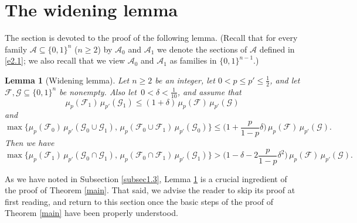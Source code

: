 \documentclass[10pt,a4paper]{amsart}
\newtheorem{lem}[thm]{Lemma}
\theoremstyle{remark}
\newcommand{\meg}{\geqslant}
\newcommand{\mik}{\leqslant}
\newcommand{\Fcal}{\mathcal{F}}
\newcommand{\Gcal}{\mathcal{G}}
\newcommand{\Acal}{\mathcal{A}}
\begin{document}

\section{The widening lemma} \label{sec4}


The section is devoted to the proof of the following lemma. (Recall that for every family
$\mathcal{A}\subseteq \{0,1\}^n$ ($n\meg 2$) by $\Acal_0$ and $\Acal_1$ we denote the
sections of $\Acal$ defined in \eqref{e2.1}; we also recall that we view
$\mathcal{A}_0$ and $\mathcal{A}_1$ as families in $\{0,1\}^{n-1}$.)
\begin{lem}[Widening lemma] \label{l4.1}
Let $n\meg 2$ be an integer, let $0<p\mik p'\mik \frac12$, and let $\Fcal,\Gcal\subseteq \{0,1\}^n$
be nonempty. Also let\, $0<\delta<\frac{1}{10}$, and assume that
\begin{equation} \label{e4.1}
\mu_p(\Fcal_1)\,\mu_{p'}(\Gcal_1)  \mik (1+\delta)\, \mu_p(\Fcal)\,\mu_{p'}(\Gcal)
\end{equation}
and
\begin{equation} \label{e4.2}  \max\big\{ \mu_p(\Fcal_0)\, \mu_{p'}(\Gcal_0  \cup\Gcal_1), \,
\mu_p(\Fcal_0\cup\Fcal_1)\, \mu_{p'}(\Gcal_0) \big\}  \mik \Big(1+\frac{p}{1-p}\delta\Big)\,
\mu_p(\Fcal)\, \mu_{p'}(\Gcal).
\end{equation}
Then we have
\begin{equation} \label{e4.3}
\max\big\{ \mu_p(\Fcal_1)\,\mu_{p'}(\Gcal_0\cap\Gcal_1), \,
\mu_p(\Fcal_0\cap\Fcal_1)\,\mu_{p'}(\Gcal_1)\big\} >
\Big(1-\delta-2\frac{p}{1-p}\delta^2\Big)\, \mu_p(\Fcal)\, \mu_{p'}(\Gcal).
\end{equation}
\end{lem}
As we have noted in Subsection \ref{subsec1.3}, Lemma \ref{l4.1} is a crucial ingredient
of the proof of Theorem \ref{main}. That said, we advise the reader to skip its proof
at first reading, and return to this section once the basic steps of the proof
of Theorem \ref{main} have been properly understood.
\end{document}
